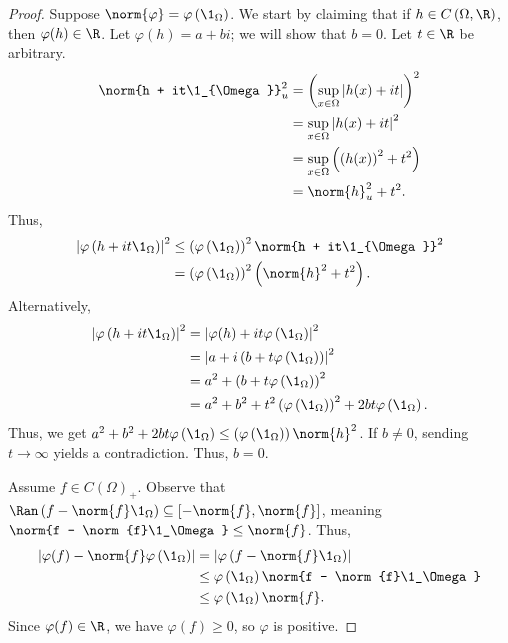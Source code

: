 \documentclass[10pt]{mypackage}
\begin{document}
\begin{proof}
  Suppose $\norm{\varphi} = \varphi\left(\1_{\Omega}\right)$. We start by claiming that if $h\in C\left(\Omega,\R\right)$, then $\varphi(h)\in \R$. Let $\varphi(h) = a + bi$; we will show that $b = 0$. Let $t\in \R$ be arbitrary.
  \begin{align*}
    \norm{h + it\1_{\Omega}}_{u}^2 &= \left(\sup_{x\in \Omega}\left\vert h(x) + it \right\vert\right)^2\\
                                   &= \sup_{x\in \Omega}\left\vert h(x) + it \right\vert^2\\
                                   &= \sup_{x\in \Omega}\left(\left(h(x)\right)^2 + t^2\right)\\
                                   &= \norm{h}_{u}^2 + t^2.
  \end{align*}
  Thus,
  \begin{align*}
    \left\vert \varphi\left(h + it\1_\Omega\right) \right\vert^2 &\leq \left(\varphi\left(\1_\Omega\right)\right)^2\norm{h + it\1_{\Omega}}^2\\
                                                                 &= \left(\varphi\left(\1_\Omega\right)\right)^2\left(\norm{h}^2 + t^2\right).
  \end{align*}
  Alternatively,
  \begin{align*}
    \left\vert \varphi\left(h + it\1_\Omega\right) \right\vert^2 &= \left\vert \varphi(h) + it\varphi\left(\1_\Omega\right) \right\vert^2\\
                                                                 &= \left\vert a + i\left(b + t\varphi\left(\1_\Omega\right)\right) \right\vert^2\\
                                                                 &= a^2 + \left(b + t\varphi\left(\1_\Omega\right)\right)^2\\
                                                                 &= a^2 + b^2 + t^2\left(\varphi\left(\1_\Omega\right)\right)^2 + 2bt\varphi\left(\1_\Omega\right).
  \end{align*}
  Thus, we get $a^2 + b^2 + 2bt\varphi\left(\1_\Omega\right) \leq \left(\varphi\left(\1_\Omega\right)\right)\norm{h}^2$. If $b \neq 0$, sending $t\rightarrow\infty$ yields a contradiction. Thus, $b = 0$.\newline

  Assume $f\in C\left(\Omega\right)_+$. Observe that $\Ran\left(f - \norm{f}\1_\Omega\right) \subseteq \left[-\norm{f},\norm{f}\right]$, meaning $\norm{f - \norm{f}\1_\Omega}\leq \norm{f}$. Thus,
  \begin{align*}
    \left\vert \varphi(f) - \norm{f}\varphi\left(\1_\Omega\right) \right\vert &= \left\vert \varphi\left(f - \norm{f}\1_\Omega\right) \right\vert\\
                                                                              &\leq \varphi\left(\1_\Omega\right)\norm{f - \norm{f}\1_\Omega}\\
                                                                              &\leq \varphi\left(\1_\Omega\right)\norm{f}.
  \end{align*}
  Since $\varphi(f)\in \R$, we have $\varphi(f) \geq 0$, so $\varphi$ is positive.
\end{proof}
\end{document}
